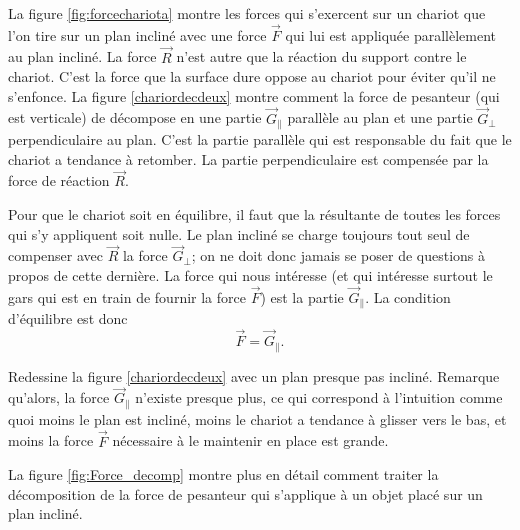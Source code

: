 \documentclass[a4paper,12pt]{book}
\theoremstyle{mes_exemples}	\newtheorem{exemple}[numtho]{Exemple}
\theoremstyle{mes_tho}
\newcommand{\fF}{\overrightarrow{F}}
\newcommand{\fG}{\overrightarrow{G}}
\newcommand{\fR}{\overrightarrow{R}}
\begin{document}
La figure \ref{fig:forcechariota} montre les forces qui s'exercent sur un chariot que l'on tire sur un plan incliné avec une force $\fF$ qui lui est appliquée parallèlement au plan incliné.  La force $\fR$ n'est autre que la réaction du support contre le chariot. C'est la force que la surface dure oppose au chariot pour éviter qu'il ne s'enfonce. La figure \ref{chariordecdeux} montre comment la force de pesanteur (qui est verticale) de décompose en une partie $\fG_{\parallel}$ parallèle au plan et une partie $\fG_{\perp}$ perpendiculaire au plan.  C'est la partie parallèle qui est responsable du fait que le chariot a tendance à retomber. La partie perpendiculaire est compensée par la force de réaction $\fR$.

Pour que le chariot soit en équilibre, il faut que la résultante de toutes les forces qui s'y appliquent soit nulle. Le plan incliné se charge toujours tout seul de compenser avec $\fR$ la force $\fG_{\perp}$; on ne doit donc jamais se poser de questions à propos de cette dernière. La force qui nous intéresse (et qui intéresse surtout le gars qui est en train de fournir la force $\fF$) est la partie $\fG_{\parallel}$. La condition d'équilibre est donc
\begin{equation}
	\fF=\fG_{\parallel}.
\end{equation}

\begin{exercice}
Redessine la figure \ref{chariordecdeux} avec un plan presque pas incliné. Remarque qu'alors, la force $\fG_{\parallel}$ n'existe presque plus, ce qui correspond à l'intuition comme quoi moins le plan est incliné, moins le chariot a tendance à glisser vers le bas, et moins la force $\fF$ nécessaire à le maintenir en place est grande. 
\end{exercice}

La figure \ref{fig:Force_decomp} montre plus en détail comment traiter la décomposition de la force de pesanteur qui s'applique à un objet placé sur un plan incliné.
\end{document}
